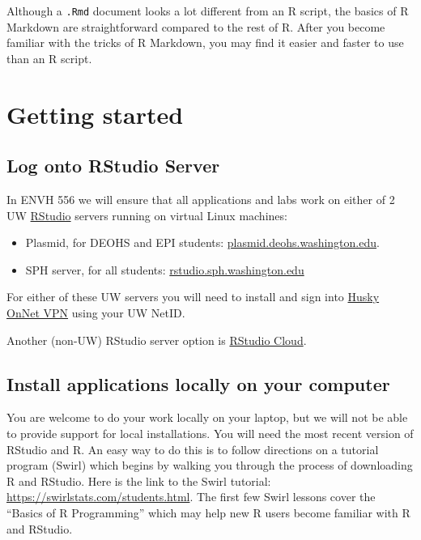 \documentclass[
]{article}
\providecommand{\tightlist}{%
  \setlength{\itemsep}{0pt}\setlength{\parskip}{0pt}}
\begin{document}
Although a \texttt{.Rmd} document looks a lot different from an R
script, the basics of R Markdown are straightforward compared to the
rest of R. After you become familiar with the tricks of R Markdown, you
may find it easier and faster to use than an R script.

\hypertarget{getting-started}{%
\section{Getting started}\label{getting-started}}

\hypertarget{log-onto-rstudio-server}{%
\subsection{Log onto RStudio Server}\label{log-onto-rstudio-server}}

In ENVH 556 we will ensure that all applications and labs work on either
of 2 UW \href{https://www.rstudio.com/}{RStudio} servers running on
virtual Linux machines:

\begin{itemize}
\tightlist
\item
  Plasmid, for DEOHS and EPI students:
  \href{https://plasmid.deohs.washington.edu/}{plasmid.deohs.washington.edu}.
\item
  SPH server, for all students:
  \href{https://rstudio.sph.washington.edu/}{rstudio.sph.washington.edu}
\end{itemize}

For either of these UW servers you will need to install and sign into
\href{https://itconnect.uw.edu/connect/uw-networks/about-husky-onnet/}{Husky
OnNet VPN} using your UW NetID.

Another (non-UW) RStudio server option is
\href{https://rstudio.cloud/}{RStudio Cloud}.

\hypertarget{install-applications-locally-on-your-computer}{%
\subsection{Install applications locally on your
computer}\label{install-applications-locally-on-your-computer}}

You are welcome to do your work locally on your laptop, but we will not
be able to provide support for local installations. You will need the
most recent version of RStudio and R. An easy way to do this is to
follow directions on a tutorial program (Swirl) which begins by walking
you through the process of downloading R and RStudio. Here is the link
to the Swirl tutorial: \url{https://swirlstats.com/students.html}. The
first few Swirl lessons cover the ``Basics of R Programming'' which may
help new R users become familiar with R and RStudio.
\end{document}
